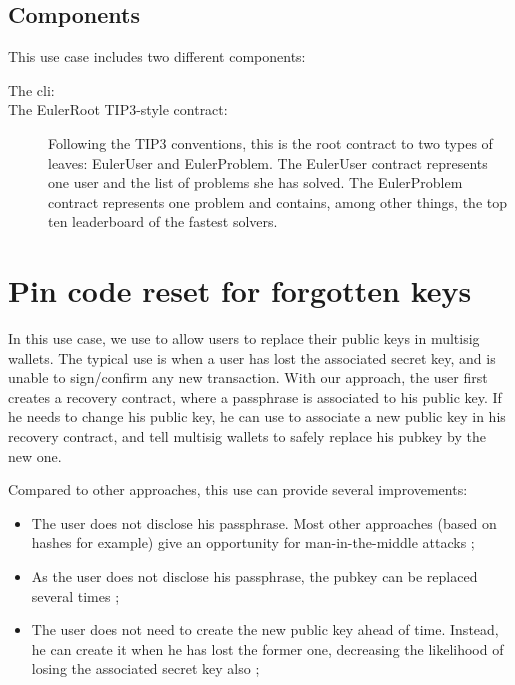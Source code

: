 \documentclass[10pt,a4paper]{article}
\begin{document}
\subsection{Components}
\label{subsec:euler_components}


This use case includes two different components:

\begin{description}
	\item[The cli:]
	\item[The EulerRoot TIP3-style contract:] Following the TIP3 conventions, this is the root contract to two types of leaves: EulerUser and EulerProblem. The EulerUser contract represents one user and the list of problems she has solved. The EulerProblem contract represents one problem and contains, among other things, the top ten leaderboard of the fastest solvers.
\end{description}

\section{Pin code reset for forgotten keys}
\label{section_pincode}

In this use case, we use \zksnarks{} to allow users to replace their
public keys in multisig wallets. The typical use is when a user has
lost the associated secret key, and is unable to sign/confirm any new
transaction. With our approach, the user first creates a recovery
contract, where a passphrase is associated to his public key. If he
needs to change his public key, he can use \zksnarks{} to associate a new
public key in his recovery contract, and tell multisig wallets to
safely replace his pubkey by the new one.

Compared to other approaches, this use can provide several
improvements:
\begin{itemize}
\item The user does not disclose his passphrase. Most other approaches
  (based on hashes for example) give an opportunity for
  man-in-the-middle attacks ;
\item As the user does not disclose his passphrase, the pubkey can be
  replaced several times ;
\item The user does not need to create the new public key ahead of
  time. Instead, he can create it when he has lost the former one,
  decreasing the likelihood of losing the associated secret key also ;
\end{itemize}
\end{document}
